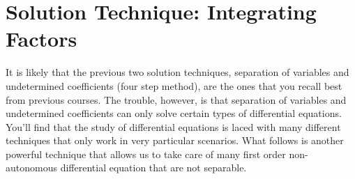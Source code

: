 % 
\newpage\section{Solution Technique: Integrating Factors}
It is likely that the previous two solution techniques, separation of variables and
undetermined coefficients (four step method), are the ones that you recall best
from previous courses.  The trouble, however, is that separation of variables and
undetermined coefficients can only solve certain types of differential equations.  You'll
find that the study of differential equations is laced with many different techniques that
only work in very particular scenarios.  What follows is another powerful technique that
allows us to take care of many first order non-autonomous differential equation that are
not separable.  
